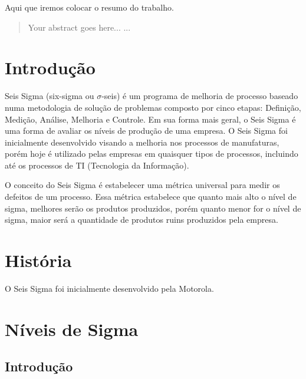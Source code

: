 \documentclass{abnt}
\begin{document}
	\capa
	
	\folhaderosto
	
	\begin{resumo}
		Aqui que iremos colocar o resumo do trabalho.
	\end{resumo}

	\begin{abstract}
		Your abstract goes here...
		...
	\end{abstract}
	
	\sumario
	
	\chapter {Introdução}
	
	Seis Sigma (six-sigma ou $\sigma$-seis) é um programa de melhoria de processo baseado numa 
	metodologia de solução de problemas composto por cinco etapas: Definição, Medição, Análise, 
	Melhoria e Controle. Em sua forma mais geral, o Seis Sigma é uma forma de avaliar os níveis 
	de produção de uma empresa. O Seis Sigma foi inicialmente desenvolvido visando a melhoria nos 
	processos de manufaturas, porém hoje é utilizado pelas empresas em quaisquer tipos de processos, 
	incluindo até os processos de TI (Tecnologia da Informação).
	
	O conceito do Seis Sigma é estabelecer uma métrica universal para medir os defeitos de um processo. 
	Essa métrica estabelece que quanto mais alto o nível de sigma, melhores serão os produtos produzidos, 
	porém quanto menor for o nível de sigma, maior será a quantidade de produtos ruins produzidos pela empresa.
	
	\chapter {História}
	
	O Seis Sigma foi inicialmente desenvolvido pela Motorola.
	
	\chapter {Níveis de Sigma}
		\section {Introdução}
\end{document}
